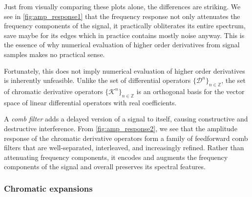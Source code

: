 \documentclass[11pt,oneside]{book}
\theoremstyle{plain}
\theoremstyle{definition}
\theoremstyle{remark}
\begin{document}
Just from visually comparing these plots alone, the differences are striking. We see in
\cref{fig:amp_response1} that the frequency response not only attenuates the frequency
components of the signal, it practically obliterates its entire spectrum, save maybe for 
its edges which in practice contains mostly noise anyway. This is the essence of why 
numerical evaluation of higher order derivatives from signal samples makes no practical 
sense.

Fortunately, this does not imply numerical evaluation of higher order derivatives is
inherently unfeasible. Unlike the set of differential operators $\{\mathcal{D}^n\}_
{n\in\mathbb{Z}}$, the set of chromatic derivative operators $\{\mathcal{K}^n\}_
{n\in\mathbb{Z}}$ is an orthogonal basis for the vector space of linear differential 
operators with real coefficients.

A \emph{comb filter} adds a delayed version of a signal to itself, causing constructive 
and destructive interference. From \cref{fig:amp_response2}, we see that the amplitude
response of the chromatic derivative operators form a family of feedforward comb filters
that are well-separated, interleaved, and increasingly refined. Rather than attenuating
frequency components, it encodes and augments the frequency components of the signal
and overall preserves its spectral features.

\subsubsection{Chromatic expansions} \label{cd_expansion}
\end{document}
